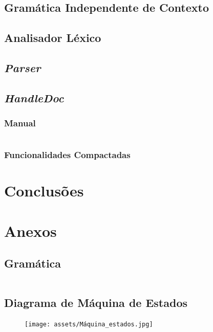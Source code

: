 \documentclass[11pt]{report}
\begin{document}
\section{Gramática Independente de Contexto} \label{subsec:grammar}


\section{Analisador Léxico} \label{subsec:lex}


\section{\textit{Parser}} \label{subsec:strat}



\section{\textit{HandleDoc}}
\subsection{Manual}
\inputminted{bash}{../assets/manual.txt}

\subsection{Funcionalidades Compactadas}



\chapter{Conclusões}



\chapter{Anexos}\label{sec:anexos}

\section{Gramática} \label{fig:grammar}
\inputminted{bash}{assets/gramatica.txt}

\section{Diagrama de Máquina de Estados}
\begin{figure}[!ht]
    \centering
    \texttt{[image: assets/Máquina\_estados.jpg]}
\end{figure}
\end{document}
